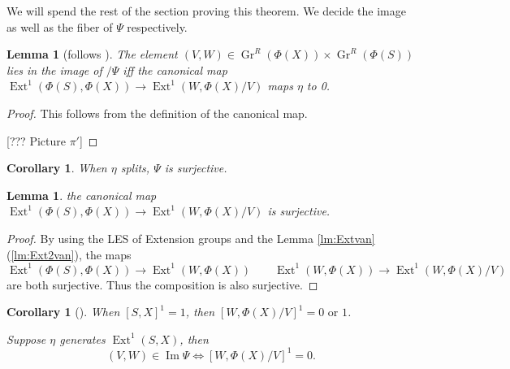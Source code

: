 \documentclass[reqno,11pt]{amsart}
\numberwithin{equation}{section}
\theoremstyle{plain}
\newtheorem{lemma}[theorem]{Lemma}
\newtheorem{corollary}[theorem]{Corollary}
\theoremstyle{plain}
\numberwithin{equation}{section}
\theoremstyle{remark}
\DeclareMathOperator{\Img}{\operatorname{Im}}
\DeclareMathOperator{\Ext}{\operatorname{Ext}}
\newcommand{\Grr}{\operatorname{Gr}^{R}}
\begin{document}
We will spend the rest of the section proving this theorem. We decide the image as well as the fiber of $\Psi$ respectively.
\begin{lemma}[follows {\cite[Lemma 21]{irelli2019cell}}]
The element $(V,W) \in \Grr(\Phi(X)) \times \Grr(\Phi(S))$ lies in the image of $/\Psi$ iff the canonical map $\Ext^1(\Phi(S),\Phi(X)) \longrightarrow \Ext^1(W,\Phi(X)/V)$ maps $\eta$ to 0.
\end{lemma}
\begin{proof}
	This follows from the definition of the canonical map.
	
	[??? Picture $\pi'$]
\end{proof}
\begin{corollary}\label{cor:img1}
	When $\eta$ splits, $\Psi$ is surjective.
\end{corollary}
\begin{lemma}
	the canonical map $\Ext^1(\Phi(S),\Phi(X)) \longrightarrow \Ext^1(W,\Phi(X)/V)$ is surjective.
\end{lemma}
\begin{proof}
	By using the LES of Extension groups and the Lemma \ref{lm:Extvan}(\ref{lm:Ext2van}), the maps
	$$\Ext^1(\Phi(S),\Phi(X)) \longrightarrow \Ext^1(W,\Phi(X))\qquad \Ext^1(W,\Phi(X)) \longrightarrow \Ext^1(W,\Phi(X)/V)$$
	are both surjective. Thus the composition is also surjective.
\end{proof}
\begin{corollary}[]\label{cor:0or1}
	When $[S,X]^1=1$, then $[W,\Phi(X)/V]^1=0 \text{ or }1$.
	
	Suppose $\eta$ generates $\Ext^1(S,X)$, then 
	$$(V,W) \in \Img \Psi \iff [W,\Phi(X)/V]^1=0.$$
\end{corollary}
\end{document}
